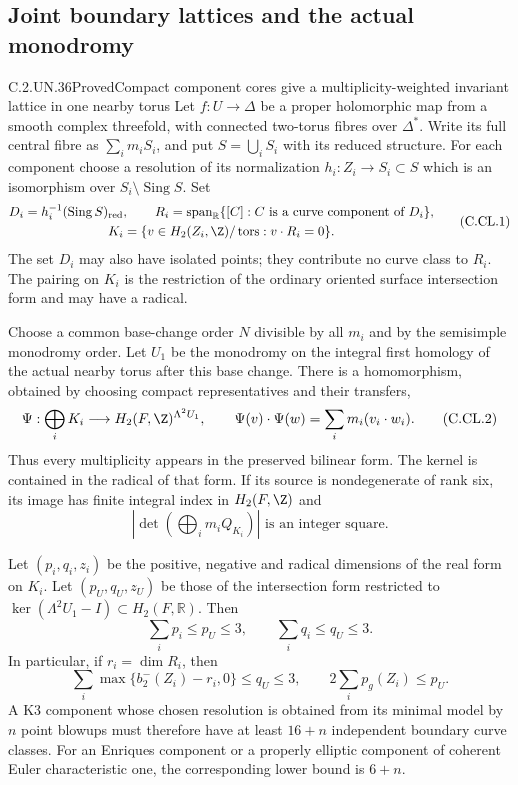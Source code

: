 \subsection{Joint boundary lattices and the actual monodromy}

\begin{statement}{C.2.UN.36}{Proved}{Compact component cores give a multiplicity-weighted invariant lattice in one nearby torus}
Let $f:U\to\Delta$ be a proper holomorphic map from
a smooth complex threefold, with connected two-torus
fibres over $\Delta^*$. Write its full central fibre
as $\sum_i m_iS_i$, and put $S=\bigcup_iS_i$ with
its reduced structure. For each component choose a
resolution of its normalization
$h_i:Z_i\to S_i\subset S$ which is an isomorphism
over $S_i\setminus\operatorname{Sing}S$. Set
\[
 \begin{gathered}
 D_i=h_i^{-1}(\operatorname{Sing}S)_{\rm red},\qquad
 R_i=\operatorname{span}_{\mathbb R}
       \{[C]:C\text{ is a curve component of }D_i\},
 \\
 K_i=\{v\in H_2(Z_i,\Z)/\operatorname{tors}:v\cdot R_i=0\}.
 \end{gathered}
                                                               \tag{C.CL.1}
\]
The set $D_i$ may also have isolated points; they
contribute no curve class to $R_i$. The pairing on
$K_i$ is the restriction of the ordinary oriented
surface intersection form and may have a radical.

Choose a common base-change order $N$ divisible by
all $m_i$ and by the semisimple monodromy order.
Let $U_1$ be the monodromy on the integral first
homology of the actual nearby torus after this
base change. There is a homomorphism, obtained by
choosing compact representatives and their transfers,
\[
 \Psi:\bigoplus_iK_i\longrightarrow
       H_2(F,\Z)^{\Lambda^2U_1},\qquad
 \Psi(v)\cdot\Psi(w)=\sum_i m_i(v_i\cdot w_i).
                                                               \tag{C.CL.2}
\]
Thus every multiplicity appears in the preserved
bilinear form. The kernel is contained in the
radical of that form. If its source is nondegenerate
of rank six, its image has finite integral index
in $H_2(F,\Z)$ and
\[
 \left|\det\left(\bigoplus_i m_iQ_{K_i}\right)\right|
                       \text{ is an integer square}.
                                                               \tag{C.CL.3}
\]

Let $(p_i,q_i,z_i)$ be the positive, negative and
radical dimensions of the real form on $K_i$.
Let $(p_U,q_U,z_U)$ be those of the intersection
form restricted to
$\ker(\Lambda^2U_1-I)\subset H_2(F,\mathbb R)$.
Then
\[
             \sum_i p_i\le p_U\le3,\qquad
             \sum_i q_i\le q_U\le3.                 \tag{C.CL.4}
\]
In particular, if $r_i=\dim R_i$, then
\[
 \sum_i\max\{b_2^-(Z_i)-r_i,0\}\le q_U\le3,
 \qquad
                 2\sum_i p_g(Z_i)\le p_U.           \tag{C.CL.5}
\]
A K3 component whose chosen resolution is obtained
from its minimal model by $n$ point blowups must
therefore have at least $16+n$ independent boundary
curve classes. For an Enriques component or a
properly elliptic component of coherent Euler
characteristic one, the corresponding lower bound
is $6+n$.


\end{statement}
